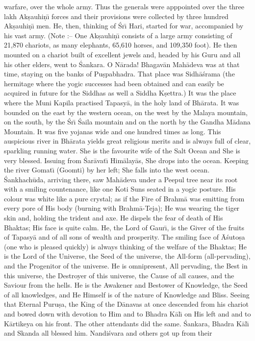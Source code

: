 warfare, over the whole army. Thus the generals were apppointed over the three lakh Ak\d{s}auhi\d{n}\={\i} forces and their provisions were collected by three hundred Ak\d{s}auhi\d{n}\={\i} men. He, then, thinking of \'Sr\={\i} Hari, started for war, accompanied by his vast army. (Note :-- One Ak\d{s}auhi\d{n}\={\i} consists of a large army consisting of 21,870 chariots, as many elephants, 65,610 horses, and 109,350 foot). He then mounted on a chariot built of excellent jewels and, headed by his Guru and all his other elders, went to \'Sankara. O N\=arada! Bhagav\=an Mah\=adeva was at that time, staying on the banks of Pu\d{s}pabhadra. That place was Sidh\=a\'srama (the hermitage where the yogic successes had been obtained and can easily be acquired in future for the Siddhas as well a Siddha K\d{s}ettra.) It was the place where the Muni Kapila practised Tapasy\=a, in the holy land of Bh\=arata. It was bounded on the east by the western ocean, on the west by the Malaya mountain, on the south, by the \'Sr\={\i} \'Saila mountain and on the north by the Gandha M\=adana Mountain. It was five yojanas wide and one hundred times as long. This auspicious river in Bh\=arata yields great religious merits and is always full of clear, sparkling running water. She is the favourite wife of the Salt Ocean and She is very blessed. Issuing from \'Sar\=avat\={\i} Him\=alay\=as, She drops into the ocean. Keeping the river Gomat\={\i} (Goomti) by her left; She falls into the west ocean. \'Sankhach\=uda, arriving there, saw Mah\=adeva under a Peepul tree near its root with a smiling countenance, like one Koti Suns seated in a yogic posture. His colour was white like a pure crystal; as if the Fire of Brahm\=a was emitting from every pore of His body (burning with Brahm\=a-Teja); He was wearing the tiger skin and, holding the trident and axe. He dispels the fear of death of His Bhaktas; His face is quite calm. He, the Lord of Gaur\={\i}, is the Giver of the fruits of Tapasy\=a and of all sons of wealth and prosperity. The smiling face of \=A\'suto\d{s}a (one who is pleased quickly) is always thinking of the welfare of the Bhaktas; He is the Lord of the Universe, the Seed of the universe, the All-form (all-pervading), and the Progenitor of the universe. He is omnipresent, All pervading, the Best in this universe, the Destroyer of this universe, the Cause of all causes, and the Saviour from the hells. He is the Awakener and Bestower of Knowledge, the Seed of all knowledges, and He Himself is of the nature of Knowledge and Bliss. Seeing that Eternal Puru\d{s}a, the King of the D\=anavas at once descended from his chariot and bowed down with devotion to Him and to Bhadra K\=al\={\i} on His left and and to K\=artikeya on his front. The other attendants did the same. \'Sankara, Bhadra K\=al\={\i} and Skanda all blessed him. Nandi\'svara and others got up from their

